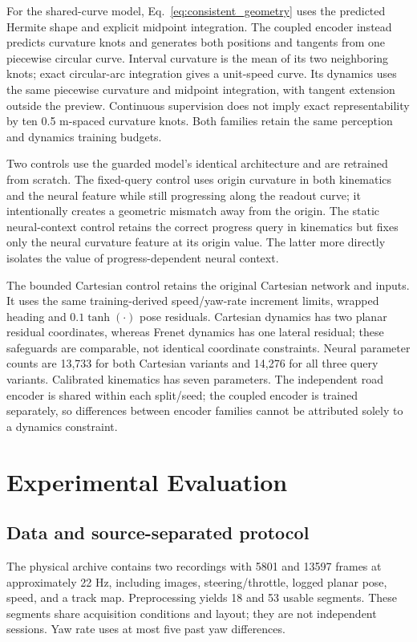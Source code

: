 \documentclass[preprint,12pt]{elsarticle}
\begin{document}
For the shared-curve model, Eq.~\ref{eq:consistent_geometry} uses the predicted
Hermite shape and explicit midpoint integration. The coupled encoder instead
predicts curvature knots and generates both positions and tangents from one
piecewise circular curve. Interval curvature is the mean of its two neighboring
knots; exact circular-arc integration gives a unit-speed curve. Its dynamics
uses the same piecewise curvature and midpoint integration, with tangent
extension outside the preview. Continuous supervision does not imply exact
representability by ten 0.5 m-spaced curvature knots. Both families retain the
same perception and dynamics training budgets.

Two controls use the guarded model's identical architecture and are retrained
from scratch. The fixed-query control uses origin curvature in both kinematics
and the neural feature while still progressing along the readout curve; it
intentionally creates a geometric mismatch away from the origin. The static
neural-context control retains the correct progress query in kinematics but
fixes only the neural curvature feature at its origin value. The latter more
directly isolates the value of progress-dependent neural context.

The bounded Cartesian control retains the original Cartesian network and
inputs. It uses the same training-derived speed/yaw-rate increment limits,
wrapped heading and $0.1\tanh(\cdot)$ pose residuals. Cartesian dynamics has two
planar residual coordinates, whereas Frenet dynamics has one lateral residual;
these safeguards are comparable, not identical coordinate constraints. Neural
parameter counts are 13,733 for both Cartesian variants and 14,276 for all three
query variants. Calibrated kinematics has seven parameters. The independent
road encoder is shared within each split/seed; the coupled encoder is trained
separately, so differences between encoder families cannot be attributed solely
to a dynamics constraint.

\section{Experimental Evaluation}\label{sec:experiments}\label{sec:setup}
\subsection{Data and source-separated protocol}
The physical archive contains two recordings with 5801 and 13597 frames at
approximately 22 Hz, including images, steering/throttle, logged planar pose,
speed, and a track map. Preprocessing yields 18 and 53 usable segments.
These segments share acquisition conditions and layout; they are not independent
sessions. Yaw rate uses at most five past yaw differences.
\end{document}
